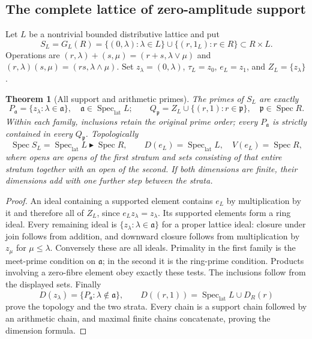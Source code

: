 \documentclass[11pt,a4paper]{article}
\newtheorem{theorem}{Theorem}[section]
\theoremstyle{definition}\newtheorem{definition}[theorem]{Definition}
\newcommand{\Spec}{\operatorname{Spec}}\newcommand{\SpecMon}{\operatorname{Spec}_{\mathrm{mon}}}
\newcommand{\SpecLat}{\operatorname{Spec}_{\mathrm{lat}}}
\begin{document}
\subsection{The complete lattice of zero-amplitude support}
Let $L$ be a nontrivial bounded distributive lattice and put
\[
 S_L=G_L(R)=\{(0,\lambda):\lambda\in L\}\cup\{(r,1_L):r\in R\}
 \subset R\times L.
\]
Operations are $(r,\lambda)+(s,\mu)=(r+s,\lambda\vee\mu)$ and
$(r,\lambda)(s,\mu)=(rs,\lambda\wedge\mu)$. Set $z_\lambda=(0,\lambda)$, $\tau_L=z_0$, $e_L=z_1$, and $Z_L=\{z_\lambda\}$.
\begin{theorem}[All support and arithmetic primes]\label{thm:rebuilt-full-support}
The primes of $S_L$ are exactly
\[
 P_{\mathfrak a}=\{z_\lambda:\lambda\in\mathfrak a\},\quad\mathfrak a\in\SpecLat L;
 \qquad Q_{\mathfrak p}=Z_L\cup\{(r,1):r\in\mathfrak p\},\quad\mathfrak p\in\Spec R.
\]
Within each family, inclusions retain the original prime order; every $P_{\mathfrak a}$ is strictly contained in every $Q_{\mathfrak p}$. Topologically
\begin{equation}\label{eq:full-spectral-base}
 \Spec S_L=\SpecLat L\blacktriangleright\Spec R,
 \qquad D(e_L)=\SpecLat L,\quad V(e_L)=\Spec R,
\end{equation}
where opens are opens of the first stratum and sets consisting of that entire stratum together with an open of the second. If both dimensions are finite, their dimensions add with one further step between the strata.
\end{theorem}
\begin{proof}
An ideal containing a supported element contains $e_L$ by multiplication by it and therefore all of $Z_L$, since $e_Lz_\lambda=z_\lambda$. Its supported elements form a ring ideal. Every remaining ideal is $\{z_\lambda:\lambda\in\mathfrak a\}$ for a proper lattice ideal: closure under join follows from addition, and downward closure follows from multiplication by $z_\mu$ for $\mu\le\lambda$. Conversely these are all ideals. Primality in the first family is the meet-prime condition on $\mathfrak a$; in the second it is the ring-prime condition. Products involving a zero-fibre element obey exactly these tests. The inclusions follow from the displayed sets. Finally
\[
 D(z_\lambda)=\{P_{\mathfrak a}:\lambda\notin\mathfrak a\},\qquad
 D((r,1))=\SpecLat L\cup D_R(r)
\]
prove the topology and the two strata. Every chain is a support chain followed by an arithmetic chain, and maximal finite chains concatenate, proving the dimension formula.
\end{proof}
\end{document}
